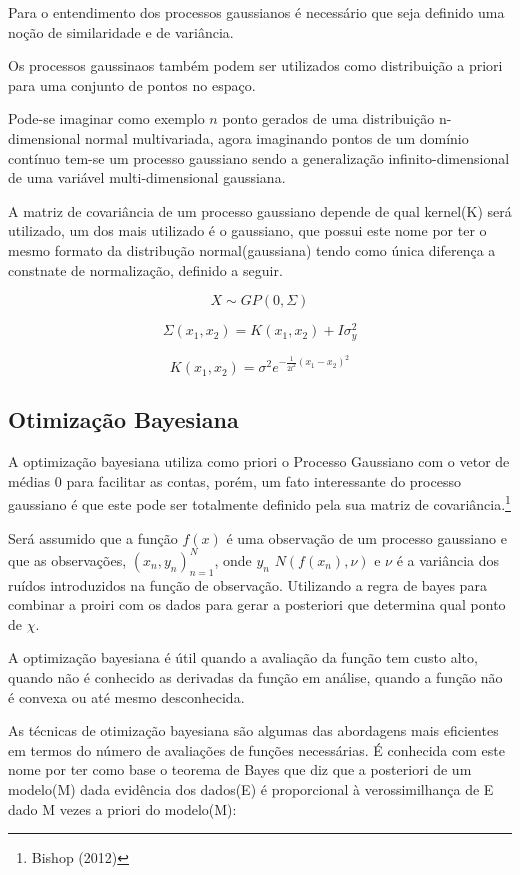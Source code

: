 \documentclass[
	12pt,				%
	a4paper,		%
	oneside,    %
	chapter=TITLE,		   %
	section=TITLE,		   %
	subsection=TITLE,	   %
	subsubsection=TITLE, %
	english,			%
	french,				%
	spanish,			%
	brazil,				%
]{abntex2}
\begin{document}
Para o entendimento dos processos gaussianos é necessário que seja
definido uma noção de similaridade e de variância.

Os processos gaussinaos também podem ser utilizados como distribuição a
priori para uma conjunto de pontos no espaço.

Pode-se imaginar como exemplo \(n\) ponto gerados de uma distribuição
n-dimensional normal multivariada, agora imaginando pontos de um domínio
contínuo tem-se um processo gaussiano sendo a generalização
infinito-dimensional de uma variável multi-dimensional gaussiana.

A matriz de covariância de um processo gaussiano depende de qual
kernel(K) será utilizado, um dos mais utilizado é o gaussiano, que
possui este nome por ter o mesmo formato da distribução
normal(gaussiana) tendo como única diferença a constnate de
normalização, definido a seguir.

\[
X \sim GP(0,\Sigma)
\]

\[
\Sigma(x_1,x_2) = K(x_1,x_2) + I\sigma^2_y
\]

\[
K(x_1,x_2) = \sigma^2 e^{-\frac{1}{2l^2}(x_1-x_2)^2}
\]

\hypertarget{otimizauxe7uxe3o-bayesiana}{%
\subsection{Otimização Bayesiana}\label{otimizauxe7uxe3o-bayesiana}}

A optimização bayesiana utiliza como priori o Processo Gaussiano com o
vetor de médias 0 para facilitar as contas, porém, um fato interessante
do processo gaussiano é que este pode ser totalmente definido pela sua
matriz de covariância.\footnote{Bishop (2012)}

Será assumido que a função \(f(x)\) é uma observação de um processo
gaussiano e que as observações, \((x_n,y_n)_{n=1}^N\), onde
\(y_n \mbox{~} N(f(x_n),\nu)\) e \(\nu\) é a variância dos ruídos
introduzidos na função de observação. Utilizando a regra de bayes para
combinar a proiri com os dados para gerar a posteriori que determina
qual ponto de \(\chi\).

A optimização bayesiana é útil quando a avaliação da função tem custo
alto, quando não é conhecido as derivadas da função em análise, quando a
função não é convexa ou até mesmo desconhecida.

As técnicas de otimização bayesiana são algumas das abordagens mais
eficientes em termos do número de avaliações de funções necessárias. É
conhecida com este nome por ter como base o teorema de Bayes que diz que
a posteriori de um modelo(M) dada evidência dos dados(E) é proporcional
à verossimilhança de E dado M vezes a priori do modelo(M):
\end{document}
